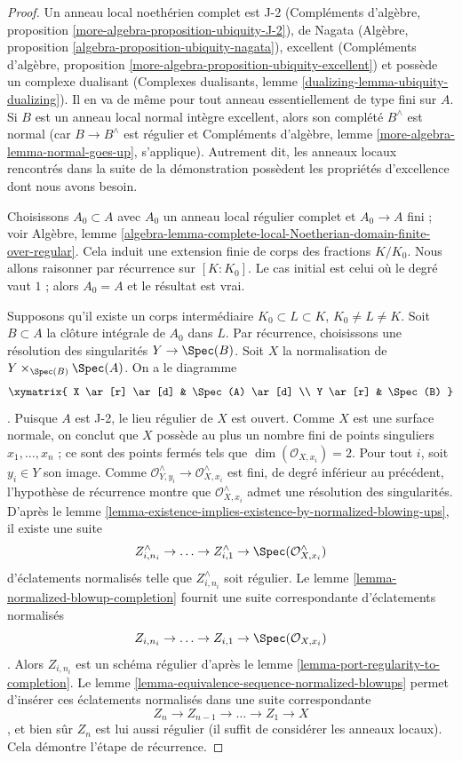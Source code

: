 \begin{proof} Un anneau local noethérien complet est J-2 (Compléments d'algèbre, proposition \ref{more-algebra-proposition-ubiquity-J-2}), de Nagata (Algèbre, proposition \ref{algebra-proposition-ubiquity-nagata}), excellent (Compléments d'algèbre, proposition \ref{more-algebra-proposition-ubiquity-excellent}) et possède un complexe dualisant (Complexes dualisants, lemme \ref{dualizing-lemma-ubiquity-dualizing}). Il en va de même pour tout anneau essentiellement de type fini sur $A$. Si $B$ est un anneau local normal intègre excellent, alors son complété $B^\wedge$ est normal (car $B \to B^\wedge$ est régulier et Compléments d'algèbre, lemme \ref{more-algebra-lemma-normal-goes-up}, s'applique). Autrement dit, les anneaux locaux rencontrés dans la suite de la démonstration possèdent les propriétés d'excellence dont nous avons besoin.

\medskip\noindent Choisissons $A_0 \subset A$ avec $A_0$ un anneau local régulier complet et $A_0 \to A$ fini ; voir Algèbre, lemme \ref{algebra-lemma-complete-local-Noetherian-domain-finite-over-regular}. Cela induit une extension finie de corps des fractions $K/K_0$. Nous allons raisonner par récurrence sur $[K : K_0]$. Le cas initial est celui où le degré vaut $1$ ; alors $A_0 = A$ et le résultat est vrai.

\medskip\noindent Supposons qu'il existe un corps intermédiaire $K_0 \subset L \subset K$, $K_0 \not = L \not = K$. Soit $B \subset A$ la clôture intégrale de $A_0$ dans $L$. Par récurrence, choisissons une résolution des singularités $Y \to \Spec(B)$. Soit $X$ la normalisation de $Y \times_{\Spec(B)} \Spec(A)$. On a le diagramme $$
\xymatrix{
X \ar[r] \ar[d] & \Spec(A) \ar[d] \\
Y \ar[r] & \Spec(B)
}
$$. Puisque $A$ est J-2, le lieu régulier de $X$ est ouvert. Comme $X$ est une surface normale, on conclut que $X$ possède au plus un nombre fini de points singuliers $x_1, \ldots, x_n$ ; ce sont des points fermés tels que $\dim(\mathcal{O}_{X, x_i}) = 2$. Pour tout $i$, soit $y_i \in Y$ son image. Comme $\mathcal{O}_{Y, y_i}^\wedge \to \mathcal{O}_{X, x_i}^\wedge$ est fini, de degré inférieur au précédent, l'hypothèse de récurrence montre que $\mathcal{O}_{X, x_i}^\wedge$ admet une résolution des singularités. D'après le lemme \ref{lemma-existence-implies-existence-by-normalized-blowing-ups}, il existe une suite $$
Z^\wedge_{i, n_i} \to \ldots \to Z^\wedge_{i, 1} \to
\Spec(\mathcal{O}_{X, x_i}^\wedge)
$$ d'éclatements normalisés telle que $Z^\wedge_{i, n_i}$ soit régulier. Le lemme \ref{lemma-normalized-blowup-completion} fournit une suite correspondante d'éclatements normalisés $$
Z_{i, n_i} \to \ldots \to Z_{i, 1} \to \Spec(\mathcal{O}_{X, x_i})
$$. Alors $Z_{i, n_i}$ est un schéma régulier d'après le lemme \ref{lemma-port-regularity-to-completion}. Le lemme \ref{lemma-equivalence-sequence-normalized-blowups} permet d'insérer ces éclatements normalisés dans une suite correspondante $$
Z_n \to Z_{n - 1} \to \ldots \to Z_1 \to X
$$, et bien sûr $Z_n$ est lui aussi régulier (il suffit de considérer les anneaux locaux). Cela démontre l'étape de récurrence.


\end{proof}
